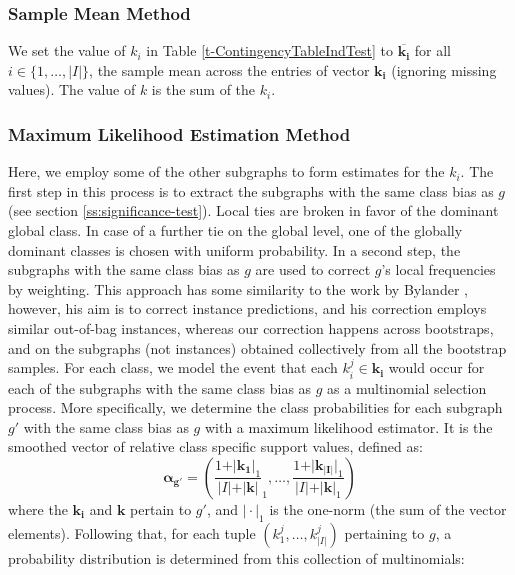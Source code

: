 \documentclass{article}
\begin{document}
\subsubsection{Sample Mean Method}
\label{ss:simple-mean}
We set the value of $k_i$ in Table \ref{t-ContingencyTableIndTest} to
$\overline{\mathbf{k_i}}$ for all $i \in \{1,\ldots,|I|\}$, the sample mean
across the entries of vector $\mathbf{k_i}$ (ignoring missing values). The
value of $k$ is the sum of the $k_i$.

\subsubsection{Maximum Likelihood Estimation Method}
\label{ss:MLE}
Here, we employ some of the other subgraphs to form estimates for the $k_i$.
The first step in this process is to extract the subgraphs with the same class
bias as $g$ (see section \ref{ss:significance-test}).  Local ties are broken in
favor of the dominant global class. In case of a further tie on the global
level, one of the globally dominant classes is chosen with uniform probability.
In a second step, the subgraphs with the same class bias as $g$ are used to correct
$g$'s local frequencies by weighting. This approach has some similarity to the
work by Bylander \cite{bylander02estimating}, however, his aim is to correct
instance predictions, and his correction employs similar out-of-bag instances,
whereas our correction happens across bootstraps, and on the subgraphs (not
instances) obtained collectively from all the bootstrap samples.  For each
class, we model the event that each $k_i^j \in \mathbf{k_i}$ would occur for
each of the subgraphs with the same class bias as $g$ as a multinomial
selection process.  More specifically, we determine the class probabilities for
each subgraph $g'$ with the same class bias as $g$ with a maximum likelihood
estimator. It is the smoothed vector of relative class specific support values,
defined as:
\begin{equation}
  \mathbf{\alpha_{g'}} = \left(\frac{1+\vert\mathbf{k_1}\vert_1}{\vert I\vert+\vert\mathbf{k}\vert}_1,\ldots,\frac{1+\vert\mathbf{k_{\vert I\vert}}\vert_1}{\vert I\vert+\vert\mathbf{k}\vert_1}\right)
  \label{eqn:mlexpr}
\end{equation}
where the $\mathbf{k_i}$ and $\mathbf{k}$ pertain to $g'$, and $\vert\cdot\vert_1$ is the one-norm (the sum of the vector elements). Following that, for
each tuple $(k_1^j,\ldots,k_{\vert I\vert}^j)$ pertaining to $g$, a probability distribution is
determined from this collection of multinomials:
\end{document}
